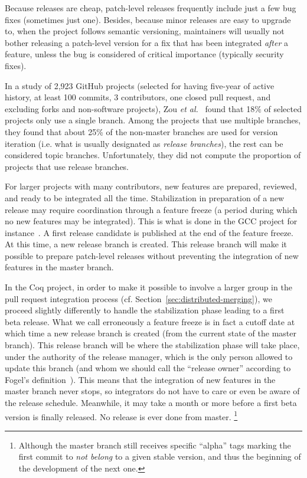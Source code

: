 Because releases are cheap, patch-level releases frequently include just a few bug fixes (sometimes just one).
Besides, because minor releases are easy to upgrade to, when the project follows semantic versioning, maintainers will usually not bother releasing a patch-level version for a fix that has been integrated \emph{after} a feature, unless the bug is considered of critical importance (typically security fixes).

In a study of 2,923 GitHub projects (selected for having five-year of active history, at least 100 commits, 3 contributors, one closed pull request, and excluding forks and non-software projects), Zou \emph{et al.}~\cite{zou2019branches} found that 18\% of selected projects only use a single branch.
Among the projects that use multiple branches, they found that about 25\% of the non-master branches are used for version iteration (i.e. what is usually designated as \emph{release branches}), the rest can be considered topic branches.
Unfortunately, they did not compute the proportion of projects that use release branches.

For larger projects with many contributors, new features are prepared, reviewed, and ready to be integrated all the time.
Stabilization in preparation of a new release may require coordination through a feature freeze (a period during which no new features may be integrated).
This is what is done in the GCC project for instance~\cite{gcc_dev_plan}.
A first release candidate is published at the end of the feature freeze.
At this time, a new release branch is created.
This release branch will make it possible to prepare patch-level releases without preventing the integration of new features in the master branch.

In the Coq project, in order to make it possible to involve a larger group in the pull request integration process (cf. Section~\ref{sec:distributed-merging}), we proceed slightly differently to handle the stabilization phase leading to a first beta release.
What we call erroneously a feature freeze is in fact a cutoff date at which time a new release branch is created (from the current state of the master branch).
This release branch will be where the stabilization phase will take place, under the authority of the release manager, which is the only person allowed to update this branch (and whom we should call the ``release owner'' according to Fogel's definition~\cite[Chapter 7]{fogel2005producing}).
This means that the integration of new features in the master branch never stops, so integrators do not have to care or even be aware of the release schedule.
Meanwhile, it may take a month or more before a first beta version is finally released.
No release is ever done from master.%
\footnote{Although the master branch still receives specific ``alpha'' tags marking the first commit to \emph{not belong} to a given stable version, and thus the beginning of the development of the next one.}

